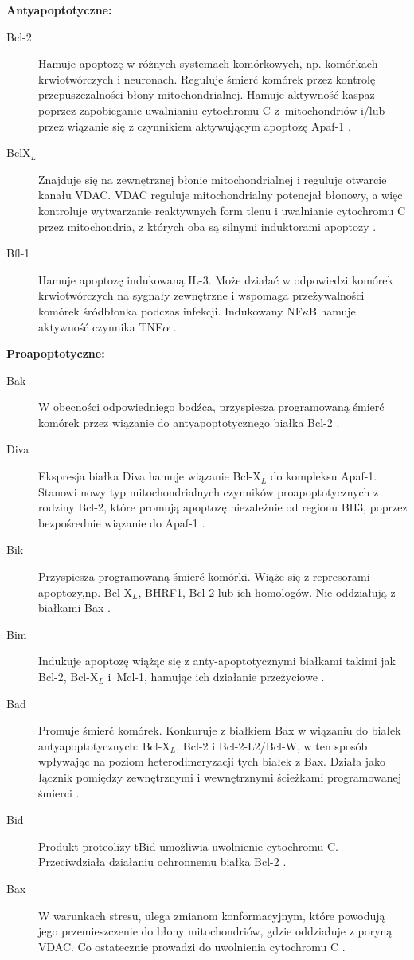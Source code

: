 \medskip

\noindent \textbf{Antyapoptotyczne:}
\begin{description}
\item [Bcl-2] Hamuje apoptozę w różnych systemach komórkowych, np. komórkach krwiotwórczych i neuronach. Reguluje śmierć komórek przez kontrolę przepuszczalności błony mitochondrialnej. Hamuje aktywność kaspaz poprzez zapobieganie uwalnianiu cytochromu C z~mitochondriów i/lub przez wiązanie się z czynnikiem aktywującym apoptozę Apaf-1 \cite{Bonneau2013,Kelly2011}.
\item [BclX$_L$] Znajduje się na zewnętrznej błonie mitochondrialnej i reguluje otwarcie kanału VDAC. VDAC reguluje mitochondrialny potencjał błonowy, a więc kontroluje wytwarzanie reaktywnych form tlenu i uwalnianie cytochromu C przez mitochondria, z których oba są silnymi induktorami apoptozy \cite{Cheng1996}.
\item [Bfl-1] Hamuje apoptozę indukowaną IL-3. Może działać w odpowiedzi komórek krwiotwórczych na sygnały zewnętrzne i wspomaga przeżywalności komórek śródbłonka podczas infekcji. Indukowany NF$\kappa$B hamuje aktywność czynnika TNF$\alpha$ \cite{Zong1999}.
\end{description}

\noindent \textbf{Proapoptotyczne:}
\begin{description}
\item [Bak] W obecności odpowiedniego bodźca, przyspiesza programowaną śmierć komórek przez wiązanie do antyapoptotycznego białka Bcl-2 \cite{Scorrano2003}.
\item [Diva] Ekspresja białka Diva hamuje wiązanie Bcl-X$_L$ do kompleksu Apaf-1. Stanowi nowy typ mitochondrialnych czynników proapoptotycznych z rodziny Bcl-2, które promują apoptozę niezależnie od regionu BH3, poprzez bezpośrednie wiązanie do Apaf-1 \cite{Inohara1998}.
\item [Bik] Przyspiesza programowaną śmierć komórki. Wiąże się z represorami apoptozy,np. Bcl-X$_L$, BHRF1, Bcl-2 lub ich homologów. Nie oddziałują z białkami Bax \cite{Tsujimoto2003}.
\item [Bim] Indukuje apoptozę wiążąc się z anty-apoptotycznymi białkami takimi jak Bcl-2, Bcl-X$_L$ i~Mcl-1, hamując ich działanie przeżyciowe \cite{Czabotar2009}.
\item [Bad] Promuje śmierć komórek. Konkuruje z białkiem Bax w wiązaniu do białek antyapoptotycznych: Bcl-X$_L$, Bcl-2 i Bcl-2-L2/Bcl-W, w ten sposób wpływając na poziom heterodimeryzacji tych białek z Bax. Działa jako łącznik pomiędzy zewnętrznymi i wewnętrznymi ścieżkami programowanej śmierci \cite{Gibson1996}.
\item [Bid] Produkt proteolizy tBid umożliwia uwolnienie cytochromu C. Przeciwdziała działaniu ochronnemu białka Bcl-2 \cite{Galluzzi2012,Hajnoczky2003}.
\item [Bax] W warunkach stresu, ulega zmianom konformacyjnym, które powodują jego przemieszczenie do błony mitochondriów, gdzie oddziałuje z poryną VDAC. Co ostatecznie prowadzi do uwolnienia cytochromu C \cite{Gautier2011,Scorrano2003}.
\end{description}


